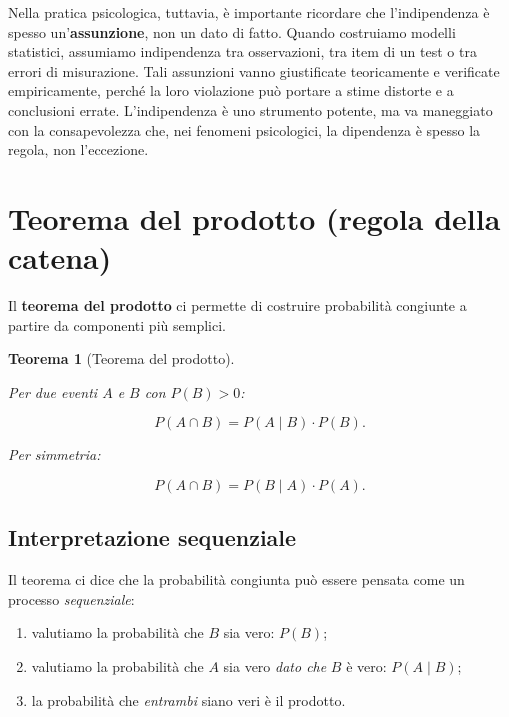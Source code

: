 \documentclass[
  italian,
  letterpaper,
  a4paper,
  11pt,
  open=any]{scrbook}
\providecommand{\tightlist}{%
  \setlength{\itemsep}{0pt}\setlength{\parskip}{0pt}}
\theoremstyle{plain}
\newtheorem{theorem}{Teorema}[chapter]
\theoremstyle{definition}
\theoremstyle{definition}
\theoremstyle{remark}
\begin{document}
Nella pratica psicologica, tuttavia, è importante ricordare che
l'indipendenza è spesso un'\textbf{assunzione}, non un dato di fatto.
Quando costruiamo modelli statistici, assumiamo indipendenza tra
osservazioni, tra item di un test o tra errori di misurazione. Tali
assunzioni vanno giustificate teoricamente e verificate empiricamente,
perché la loro violazione può portare a stime distorte e a conclusioni
errate. L'indipendenza è uno strumento potente, ma va maneggiato con la
consapevolezza che, nei fenomeni psicologici, la dipendenza è spesso la
regola, non l'eccezione.

\section{Teorema del prodotto (regola della
catena)}\label{sec-product-rule}

Il \textbf{teorema del prodotto} ci permette di costruire probabilità
congiunte a partire da componenti più semplici.

\begin{theorem}[Teorema del
prodotto]\protect\hypertarget{thm-product-rule}{}\label{thm-product-rule}

Per due eventi \(A\) e \(B\) con \(P(B) > 0\):

\[
P(A \cap B) = P(A \mid B) \cdot P(B).
\]

Per simmetria:

\[
P(A \cap B) = P(B \mid A) \cdot P(A).
\]

\end{theorem}

\subsection{Interpretazione
sequenziale}\label{interpretazione-sequenziale}

Il teorema ci dice che la probabilità congiunta può essere pensata come
un processo \emph{sequenziale}:

\begin{enumerate}
\def\labelenumi{\arabic{enumi}.}
\tightlist
\item
  valutiamo la probabilità che \(B\) sia vero: \(P(B)\);
\item
  valutiamo la probabilità che \(A\) sia vero \emph{dato che} \(B\) è
  vero: \(P(A \mid B)\);
\item
  la probabilità che \emph{entrambi} siano veri è il prodotto.
\end{enumerate}
\end{document}
